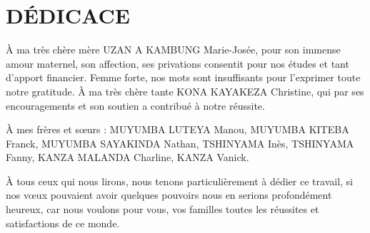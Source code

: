 \chapter*{DÉDICACE}
    À ma très chère mère UZAN A KAMBUNG Marie-Josée, pour son immense amour maternel,
    son affection, ses privations consentit pour nos études et tant d’apport financier. Femme forte, nos mots
    sont insuffisants pour l’exprimer toute notre gratitude. 
    À ma très chère tante KONA KAYAKEZA Christine, qui par ses encouragements et son soutien a contribué à notre réussite.
    \par
    À mes frères et sœurs : MUYUMBA LUTEYA Manou, MUYUMBA KITEBA Franck, MUYUMBA SAYAKINDA Nathan, TSHINYAMA Inès, TSHINYAMA 
    Fanny, KANZA MALANDA Charline, KANZA Vanick.
    \par
    À tous ceux qui nous lirons, nous tenons particulièrement à dédier ce travail, si nos vœux
    pouvaient avoir quelques pouvoirs nous en serions profondément heureux, car nous
    voulons pour vous, vos familles toutes les réussites et satisfactions de ce monde.